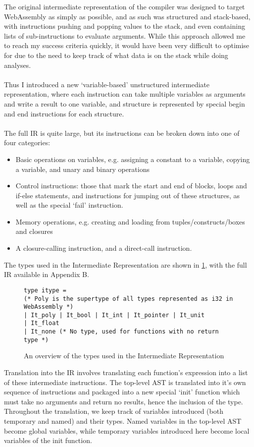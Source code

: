 The original intermediate representation of the compiler was designed to target WebAssembly as simply as possible, and as such was structured and stack-based, with instructions pushing and popping values to the stack, and even containing lists of sub-instructions to evaluate arguments. While this approach allowed me to reach my success criteria quickly, it would have been very difficult to optimise for due to the need to keep track of what data is on the stack while doing analyses.
\\\\
Thus I introduced a new `variable-based' unstructured intermediate representation, where each instruction can take multiple variables as arguments and write a result to one variable, and structure is represented by special begin and end instructions for each structure.
\\\\
The full IR is quite large, but its instructions can be broken down into one of four categories:
\begin{itemize}
\item Basic operations on variables, e.g. assigning a constant to a variable, copying a variable, and unary and binary operations
\item Control instructions: those that mark the start and end of blocks, loops and if-else statements, and instructions for jumping out of these structures, as well as the special `fail' instruction.
\item Memory operations, e.g. creating and loading from tuples/constructs/boxes and closures
\item A closure-calling instruction, and a direct-call instruction.
\end{itemize}
The types used in the Intermediate Representation are shown in \ref{fig:ir}, with the full IR available in Appendix B.
\begin{figure}[h]
\begin{verbatim}
type itype =
(* Poly is the supertype of all types represented as i32 in WebAssembly *)
| It_poly | It_bool | It_int | It_pointer | It_unit
| It_float
| It_none (* No type, used for functions with no return type *)
\end{verbatim}
\caption{An overview of the types used in the Intermediate Representation}
\label{fig:ir}
\end{figure}
Translation into the IR involves translating each function's expression into a list of these intermediate instructions. The top-level AST is translated into it's own sequence of instructions and packaged into a new special `init' function which must take no arguments and return no results, hence the inclusion of the  type. Throughout the translation, we keep track of variables introduced (both temporary and named) and their types. Named variables in the top-level AST become global variables, while temporary variables introduced here become local variables of the init function.
